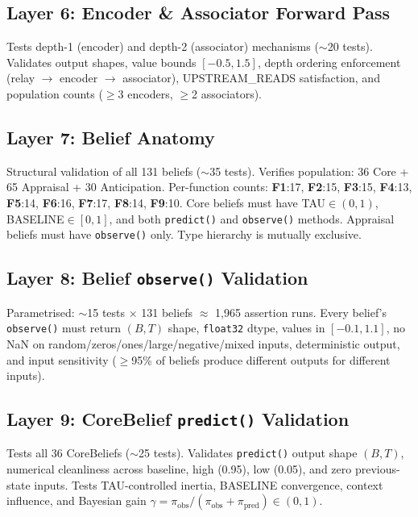 \documentclass[10pt,twocolumn]{article}
\newcommand{\fn}[1]{\textbf{F#1}}
\begin{document}
\subsection{Layer 6: Encoder \& Associator Forward Pass}

Tests depth-1 (encoder) and depth-2 (associator) mechanisms ($\sim$20 tests). Validates output shapes, value bounds $[-0.5, 1.5]$, depth ordering enforcement (relay $\to$ encoder $\to$ associator), UPSTREAM\_READS satisfaction, and population counts ($\geq$3 encoders, $\geq$2 associators).

\subsection{Layer 7: Belief Anatomy}

Structural validation of all 131 beliefs ($\sim$35 tests). Verifies population: 36 Core + 65 Appraisal + 30 Anticipation. Per-function counts: \fn{1}:17, \fn{2}:15, \fn{3}:15, \fn{4}:13, \fn{5}:14, \fn{6}:16, \fn{7}:17, \fn{8}:14, \fn{9}:10. Core beliefs must have TAU$\in(0,1)$, BASELINE$\in[0,1]$, and both \texttt{predict()} and \texttt{observe()} methods. Appraisal beliefs must have \texttt{observe()} only. Type hierarchy is mutually exclusive.

\subsection{Layer 8: Belief \texttt{observe()} Validation}

Parametrised: $\sim$15 tests $\times$ 131 beliefs $\approx$ 1,965 assertion runs. Every belief's \texttt{observe()} must return $(B,T)$ shape, \texttt{float32} dtype, values in $[-0.1, 1.1]$, no NaN on random/zeros/ones/large/negative/mixed inputs, deterministic output, and input sensitivity ($\geq$95\% of beliefs produce different outputs for different inputs).

\subsection{Layer 9: CoreBelief \texttt{predict()} Validation}

Tests all 36 CoreBeliefs ($\sim$25 tests). Validates \texttt{predict()} output shape $(B,T)$, numerical cleanliness across baseline, high (0.95), low (0.05), and zero previous-state inputs. Tests TAU-controlled inertia, BASELINE convergence, context influence, and Bayesian gain $\gamma = \pi_{\text{obs}} / (\pi_{\text{obs}} + \pi_{\text{pred}}) \in (0,1)$.
\end{document}

